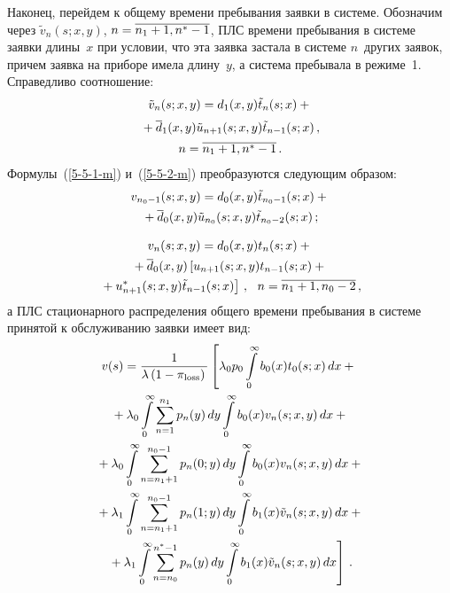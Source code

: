 \begin{multicols}{2}
Наконец, перейдем к общему времени пребывания заявки в
системе.
Обозначим через
$\tilde{v}_{n}(s;x,y)$, $n\hm=\overline{n_1+1,n^*-1}$,
ПЛС времени пребывания в сис\-те\-ме заявки длины~$x$ при
условии, что эта заявка застала в системе $n$~других
заявок, причем заявка на приборе имела длину~$y$, а
система пребывала в режиме~1.
Справедливо соотношение:
\begin{multline*}
\tilde{v}_{n}(s;x,y) = d_1(x,y) \tilde{t}_{n}(s;x) +{}\\[2pt]
{}+\overline d_1(x,y) \tilde{u}_{n+1}(s;x,y) \tilde{t}_{n-1}(s;x)\,,\\[2pt]
  n=\overline{n_1+1,n^*-1}\,.
\end{multline*}
Формулы~(\ref{5-5-1-m}) и~(\ref{5-5-2-m}) преобразуются
следующим образом:
\begin{multline*}
v_{n_0-1}(s;x,y)= d_0(x,y) \tilde{t}_{n_0-1}(s;x) +{}\\
{}+
\overline d_0(x,y) \tilde{u}_{n_0}(s;x,y) \tilde{t}_{n_0-2}(s;x) \,;
\end{multline*}
\vspace*{-12pt}

\noindent
\begin{multline*}
v_{n}(s;x,y) = d_0(x,y) t_{n}(s;x) +{}
\\
{}+
\overline d_0(x,y) \left[ u_{n+1}(s;x,y) t_{n-1}(s;x) +{}\right.\\
\left.{}+
u^*_{n+1}(s;x,y) \tilde{t}_{n-1}(s;x) \right] \,,
\ \ n=\overline{n_1+1,n_0-2}\,,
\end{multline*}
а ПЛС стационарного распределения общего времени пребывания
в системе принятой к обслуживанию заявки имеет вид:
\begin{multline*}
v(s)= \displaystyle\frac{\displaystyle 1\mathstrut}{\displaystyle  \lambda \left(1-\pi_{\mathrm{loss}}\right)\mathstrut}
\left[
\lambda_0 p_0 \int\limits_0^\infty b_0(x) t_0(s;x) \, dx
+{}\right.\\
\left.{}+ \lambda_0 \int\limits_0^\infty \sum\limits_{n=1}^{n_1}
p_n(y) \, dy \int\limits_0^\infty b_0(x) v_n(s;x,y) \, dx +{}\right.
\\
{}+
\lambda_0 \int\limits_0^\infty \sum\limits_{n=n_1+1}^{n_0-1}
p_n(0;y)\, dy \int\limits_0^\infty b_0(x) v_n(s;x,y) \, dx +{}\\
{}+ \lambda_1 \int\limits_0^\infty \sum\limits_{n=n_1+1}^{n_0-1}
p_n(1;y)\, dy \int\limits_0^\infty b_1(x) \tilde{v}_n(s;x,y) \, dx+{}\\
\left.{}+ \lambda_1 \int\limits_0^\infty \sum\limits_{n=n_0}^{n^*-1} p_n(y)\, dy
\int\limits_0^\infty b_1(x) \tilde{v}_n(s;x,y)\, dx
\right]\,.
\end{multline*}


\end{multicols}
